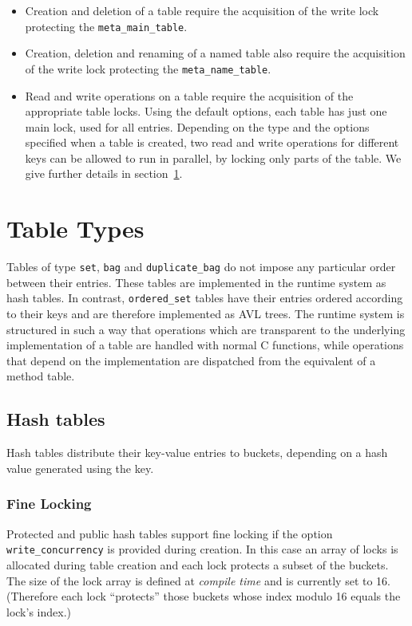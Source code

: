 \documentclass[aps,pre,preprint,nofootinbib]{revtex4}
\begin{document}
\begin{itemize}
\item Creation and deletion of a table require the acquisition of the write lock protecting the \verb|meta_main_table|.
\item Creation, deletion and renaming of a named table also require the acquisition of the write lock protecting the \verb|meta_name_table|.
\item Read and write operations on a table require the acquisition of the appropriate table locks.
  Using the default options, each table has just one main lock, used for all entries.
  Depending on the type and the options specified when a table is created, two read and write operations for different keys can be allowed to run in parallel, by locking only parts of the table.
  We give further details in section~\ref{sec:table_types}.
\end{itemize}

\section{Table Types} \label{sec:table_types}

Tables of type \verb|set|, \verb|bag| and \verb|duplicate_bag| do not impose any particular order between their entries.
These tables are implemented in the runtime system as hash tables.
In contrast, \verb|ordered_set| tables have their entries ordered according to their keys and are therefore implemented as AVL trees.
The runtime system is structured in such a way that operations which are transparent to the underlying implementation of a table are handled with normal C functions, while operations that depend on the implementation are dispatched from the equivalent of a method table.

\subsection{Hash tables}

Hash tables distribute their key-value entries to buckets, depending on a hash value generated using the key.

\subsubsection{Fine Locking}

Protected and public hash tables support fine locking if the option \verb|write_concurrency| is provided during creation.
In this case an array of locks is allocated during table creation and each lock protects a subset of the buckets.
The size of the lock array is defined at \emph{compile time} and is currently set to 16.
(Therefore each lock ``protects'' those buckets whose index modulo 16 equals the lock's index.)
\end{document}
